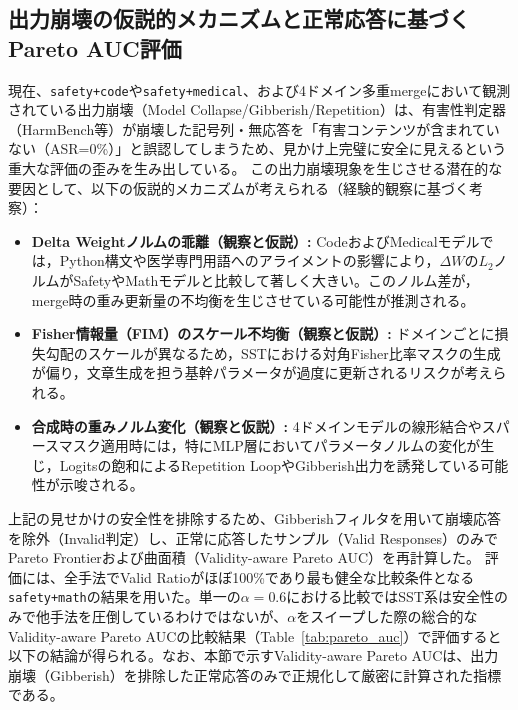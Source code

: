 \subsection{出力崩壊の仮説的メカニズムと正常応答に基づくPareto AUC評価}
現在、\texttt{safety+code}や\texttt{safety+medical}、および4ドメイン多重mergeにおいて観測されている出力崩壊（Model Collapse/Gibberish/Repetition）は、有害性判定器（HarmBench等）が崩壊した記号列・無応答を「有害コンテンツが含まれていない（ASR=0\%）」と誤認してしまうため、見かけ上完璧に安全に見えるという重大な評価の歪みを生み出している。
この出力崩壊現象を生じさせる潜在的な要因として、以下の仮説的メカニズムが考えられる（経験的観察に基づく考察）：
\begin{itemize}
    \item \textbf{Delta Weightノルムの乖離（観察と仮説）:}
    CodeおよびMedicalモデルでは，Python構文や医学専門用語へのアライメントの影響により，$\Delta W$の$L_2$ノルムがSafetyやMathモデルと比較して著しく大きい。このノルム差が，merge時の重み更新量の不均衡を生じさせている可能性が推測される。
    \item \textbf{Fisher情報量（FIM）のスケール不均衡（観察と仮説）:}
    ドメインごとに損失勾配のスケールが異なるため，SSTにおける対角Fisher比率マスクの生成が偏り，文章生成を担う基幹パラメータが過度に更新されるリスクが考えられる。
    \item \textbf{合成時の重みノルム変化（観察と仮説）:}
    4ドメインモデルの線形結合やスパースマスク適用時には，特にMLP層においてパラメータノルムの変化が生じ，Logitsの飽和によるRepetition LoopやGibberish出力を誘発している可能性が示唆される。
\end{itemize}

上記の見せかけの安全性を排除するため、Gibberishフィルタを用いて崩壊応答を除外（Invalid判定）し、正常に応答したサンプル（Valid Responses）のみでPareto Frontierおよび曲面積（Validity-aware Pareto AUC）を再計算した。
評価には、全手法でValid Ratioがほぼ100\%であり最も健全な比較条件となる\texttt{safety+math}の結果を用いた。単一の$\alpha=0.6$における比較ではSST系は安全性のみで他手法を圧倒しているわけではないが、$\alpha$をスイープした際の総合的なValidity-aware Pareto AUCの比較結果（Table~\ref{tab:pareto_auc}）で評価すると以下の結論が得られる。なお、本節で示すValidity-aware Pareto AUCは、出力崩壊（Gibberish）を排除した正常応答のみで正規化して厳密に計算された指標である。

